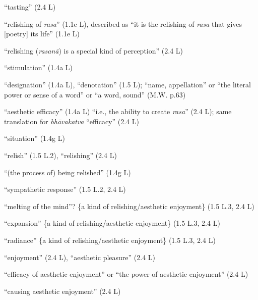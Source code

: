 \documentclass[10pt]{article}
\begin{document}
\begin{multicols}{2}
\begin{enumerate}[
			leftmargin=0em,
			rightmargin=0em,
		]
		 ``tasting'' (2.4 L)

		 ``relishing of \textit{rasa}'' (1.1e L),
		described as ``it is the relishing of \textit{rasa} that gives [poetry] its life'' (1.1e L)

		 ``relishing (\textit{rasanā}) is a special kind of perception'' (2.4 L)




		 ``stimulation'' (1.4a L)

		 ``designation'' (1.4a L),
		``denotation'' (1.5 L);
		``name, appellation'' or
		``the literal power or sense of a word'' or
		``a word, sound'' (M.W. p.63)

		 ``aesthetic efficacy'' (1.4a L)
		``i.e., the ability to create \textit{rasa}'' (2.4 L);
		same translation for \textit{bhāvakatva} ``efficacy'' (2.4 L) %

		 ``situation'' (1.4g L)

		 ``relish'' (1.5 L.2),
		``relishing'' (2.4 L)

		 ``(the process of) being relished'' (1.4g L)

		 ``sympathetic response'' (1.5 L.2, 2.4 L)

		 ``melting of the mind''? \{a kind of relishing/aesthetic enjoyment\} (1.5 L.3, 2.4 L)

		 ``expansion'' \{a kind of relishing/aesthetic enjoyment\} (1.5 L.3, 2.4 L)

		 ``radiance'' \{a kind of relishing/aesthetic enjoyment\} (1.5 L.3, 2.4 L)

		 ``enjoyment'' (2.4 L),
		``aesthetic pleasure'' (2.4 L)

		 ``efficacy of aesthetic enjoyment'' or ``the power of aesthetic enjoyment'' (2.4 L) %

		 ``causing aesthetic enjoyment'' (2.4 L)


\end{enumerate}
\end{multicols}
\end{document}
